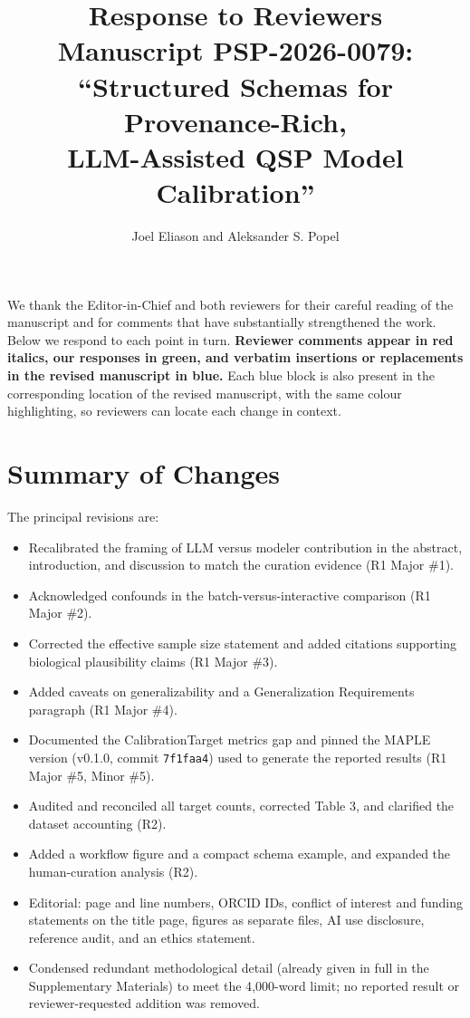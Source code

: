 \documentclass[11pt]{article}
\title{Response to Reviewers\\
\large Manuscript PSP-2026-0079:\\
``Structured Schemas for Provenance-Rich,\\
LLM-Assisted QSP Model Calibration''}
\author{Joel Eliason and Aleksander S. Popel}
\date{}
\begin{document}
\maketitle

We thank the Editor-in-Chief and both reviewers for their careful reading of the manuscript and for comments that have substantially strengthened the work. Below we respond to each point in turn. \textbf{Reviewer comments appear in red italics, our responses in green, and verbatim insertions or replacements in the revised manuscript in blue.} Each blue block is also present in the corresponding location of the revised manuscript, with the same colour highlighting, so reviewers can locate each change in context.

\bigskip

\section*{Summary of Changes}

The principal revisions are:
\begin{itemize}[leftmargin=*]
  \item Recalibrated the framing of LLM versus modeler contribution in the abstract, introduction, and discussion to match the curation evidence (R1 Major \#1).
  \item Acknowledged confounds in the batch-versus-interactive comparison (R1 Major \#2).
  \item Corrected the effective sample size statement and added citations supporting biological plausibility claims (R1 Major \#3).
  \item Added caveats on generalizability and a Generalization Requirements paragraph (R1 Major \#4).
  \item Documented the CalibrationTarget metrics gap and pinned the MAPLE version (v0.1.0, commit \texttt{7f1faa4}) used to generate the reported results (R1 Major \#5, Minor \#5).
  \item Audited and reconciled all target counts, corrected Table 3, and clarified the dataset accounting (R2).
  \item Added a workflow figure and a compact schema example, and expanded the human-curation analysis (R2).
  \item Editorial: page and line numbers, ORCID IDs, conflict of interest and funding statements on the title page, figures as separate files, AI use disclosure, reference audit, and an ethics statement.
  \item Condensed redundant methodological detail (already given in full in the Supplementary Materials) to meet the 4{,}000-word limit; no reported result or reviewer-requested addition was removed.
\end{itemize}
\end{document}
